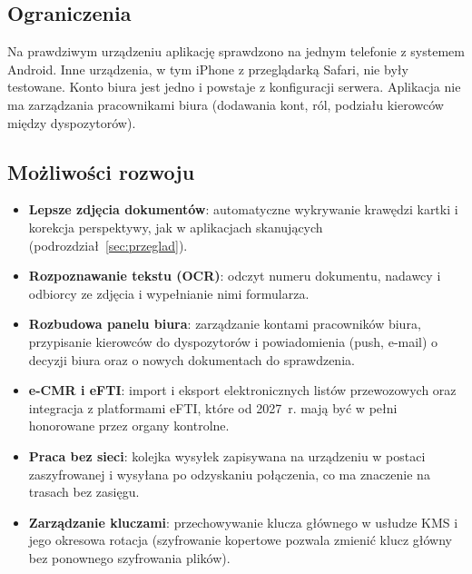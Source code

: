 \subsection{Ograniczenia}

Na prawdziwym urządzeniu aplikację sprawdzono na jednym telefonie z systemem
Android. Inne urządzenia, w tym iPhone z przeglądarką Safari, nie były
testowane. Konto biura jest jedno
i powstaje z konfiguracji serwera. Aplikacja nie ma zarządzania pracownikami
biura (dodawania kont, ról, podziału kierowców między dyspozytorów).

\subsection{Możliwości rozwoju}

\begin{itemize}
  \item \textbf{Lepsze zdjęcia dokumentów}: automatyczne wykrywanie krawędzi
        kartki i korekcja perspektywy, jak w aplikacjach skanujących
        (podrozdział~\ref{sec:przeglad}).
  \item \textbf{Rozpoznawanie tekstu (OCR)}: odczyt numeru dokumentu,
        nadawcy i odbiorcy ze zdjęcia i wypełnianie nimi formularza.
  \item \textbf{Rozbudowa panelu biura}: zarządzanie kontami pracowników
        biura, przypisanie kierowców do dyspozytorów i powiadomienia (push,
        e-mail) o decyzji biura oraz o nowych dokumentach do sprawdzenia.
  \item \textbf{e-CMR i eFTI}: import i eksport elektronicznych listów
        przewozowych oraz integracja z platformami eFTI, które od 2027~r.
        mają być w pełni honorowane przez organy kontrolne.
  \item \textbf{Praca bez sieci}: kolejka wysyłek zapisywana na urządzeniu
        w postaci zaszyfrowanej i wysyłana po odzyskaniu połączenia, co ma
        znaczenie na trasach bez zasięgu.
  \item \textbf{Zarządzanie kluczami}: przechowywanie klucza głównego
        w usłudze KMS i jego okresowa rotacja (szyfrowanie kopertowe
        pozwala zmienić klucz główny bez ponownego szyfrowania plików).
\end{itemize}
